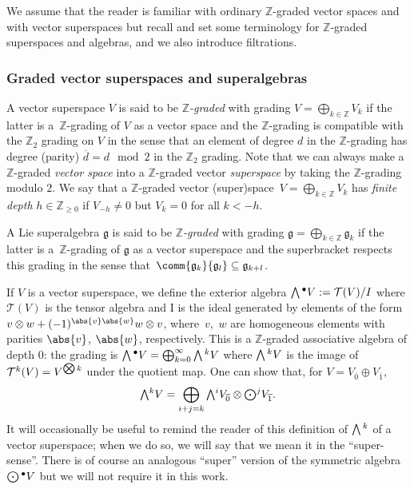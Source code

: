 \documentclass[pdftex]{sigma}
\numberwithin{equation}{section}
\newcommand{\fg}{\mathfrak{g}}
\newcommand{\ZZ}{\mathbb{Z}}
\newcommand{\Wedge}{\mathchoice{{\textstyle\bigwedge}}{\bigwedge}{\bigwedge}{\bigwedge}}	%
\newcommand{\Odot}{\mathchoice{{\textstyle\bigodot}}{\bigodot}{\bigodot}{\bigodot}}
\newcommand{\Otimes}{\mathchoice{{\textstyle\bigotimes}}{\bigotimes}{\bigotimes}{\bigotimes}}
\newcommand{\1}{\mathbbm{1}}
\begin{document}
We assume that the reader is familiar with ordinary $\ZZ$-graded vector spaces and with vector superspaces but recall and set some terminology for $\ZZ$-graded superspaces and algebras, and we also introduce filtrations.

\subsubsection{Graded vector superspaces and superalgebras}
\label{sec:graded-superalg}

A vector superspace $V$ is said to be \emph{$\ZZ$-graded} with grading $V=\bigoplus_{k\in\ZZ}V_k$ if the latter is a~$\ZZ$-grading of $V$ as a vector space and the $\ZZ$-grading is compatible with the $\ZZ_2$ grading on $V$ in the sense that an element of degree $d$ in the $\ZZ$-grading has degree (parity) $\overline{d}=d\mod 2$ in the $\ZZ_2$ grading. Note that we can always make a $\ZZ$-graded \emph{vector space} into a $\ZZ$-graded vector \emph{superspace} by taking the $\ZZ$-grading modulo $2$. We say that a $\ZZ$-graded vector (super)space~${V=\bigoplus_{k\in\ZZ}V_k}$ has \emph{finite depth} $h\in\ZZ_{\geq 0}$ if $V_{-h}\neq 0$ but $V_k=0$ for all $k<-h$.

A Lie superalgebra $\fg$ is said to be \emph{$\ZZ$-graded} with grading $\fg=\bigoplus_{k\in\ZZ}\fg_k$ if the latter is a~$\ZZ$-grading of $\fg$ as a vector superspace and the superbracket respects this grading in the sense that~${\comm{\fg_k}{\fg_l}\subseteq\fg_{k+l}}$.

If $V$ is a vector superspace, we define the exterior algebra $\Wedge^\bullet V:=\mathcal{T}(V)/I$ where $\mathcal{T}(V)$ is the tensor algebra and I is the ideal generated by elements of the form $v\otimes w + (-1)^{\abs{v}\abs{w}}w\otimes v$, where~$v$,~$w$ are homogeneous elements with parities $\abs{v}$, $\abs{w}$, respectively. This is a $\ZZ$-graded associative algebra of depth 0: the grading is $\Wedge^\bullet V = \bigoplus_{k=0}^\infty \Wedge^k V$ where $\Wedge^k V$ is the image of~${\mathcal{T}^k(V)= V^{\Otimes k}}$ under the quotient map. One can show that, for $V=V_{\overline{0}}\oplus V_{\overline{1}}$,
\begin{equation}\label{eq:super-wedge}
	\Wedge^k V = \bigoplus_{i+j=k}\Wedge^i V_{\overline{0}}\otimes\Odot^j V_{\overline{1}}.
\end{equation}
It will occasionally be useful to remind the reader of this definition of $\Wedge^k$ of a vector superspace; when we do so, we will say that we mean it in the ``super-sense''. There is of course an analogous ``super'' version of the symmetric algebra $\Odot^\bullet V$ but we will not require it in this work.
\end{document}
